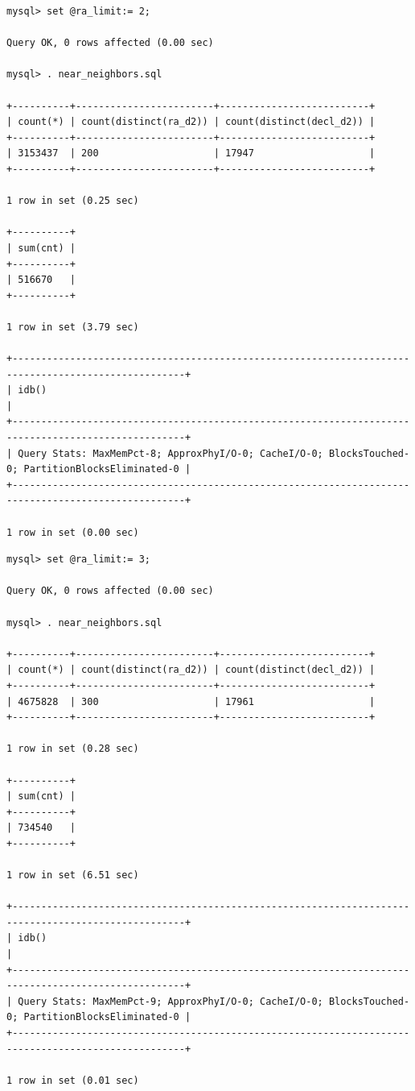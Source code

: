 \documentclass[DM,lsstdraft,toc]{lsstdoc}
\begin{document}
\begin{verbatim}
mysql> set @ra_limit:= 2;

Query OK, 0 rows affected (0.00 sec)

mysql> . near_neighbors.sql

+----------+------------------------+--------------------------+
| count(*) | count(distinct(ra_d2)) | count(distinct(decl_d2)) |
+----------+------------------------+--------------------------+
| 3153437  | 200                    | 17947                    |
+----------+------------------------+--------------------------+

1 row in set (0.25 sec)

+----------+
| sum(cnt) |
+----------+
| 516670   |
+----------+

1 row in set (3.79 sec)

+----------------------------------------------------------------------------------------------------+
| idb()                                                                                              |
+----------------------------------------------------------------------------------------------------+
| Query Stats: MaxMemPct-8; ApproxPhyI/O-0; CacheI/O-0; BlocksTouched-0; PartitionBlocksEliminated-0 |
+----------------------------------------------------------------------------------------------------+

1 row in set (0.00 sec)
\end{verbatim}

\begin{verbatim}
mysql> set @ra_limit:= 3;

Query OK, 0 rows affected (0.00 sec)

mysql> . near_neighbors.sql

+----------+------------------------+--------------------------+
| count(*) | count(distinct(ra_d2)) | count(distinct(decl_d2)) |
+----------+------------------------+--------------------------+
| 4675828  | 300                    | 17961                    |
+----------+------------------------+--------------------------+

1 row in set (0.28 sec)

+----------+
| sum(cnt) |
+----------+
| 734540   |
+----------+

1 row in set (6.51 sec)

+----------------------------------------------------------------------------------------------------+
| idb()                                                                                              |
+----------------------------------------------------------------------------------------------------+
| Query Stats: MaxMemPct-9; ApproxPhyI/O-0; CacheI/O-0; BlocksTouched-0; PartitionBlocksEliminated-0 |
+----------------------------------------------------------------------------------------------------+

1 row in set (0.01 sec)
\end{verbatim}
\end{document}
